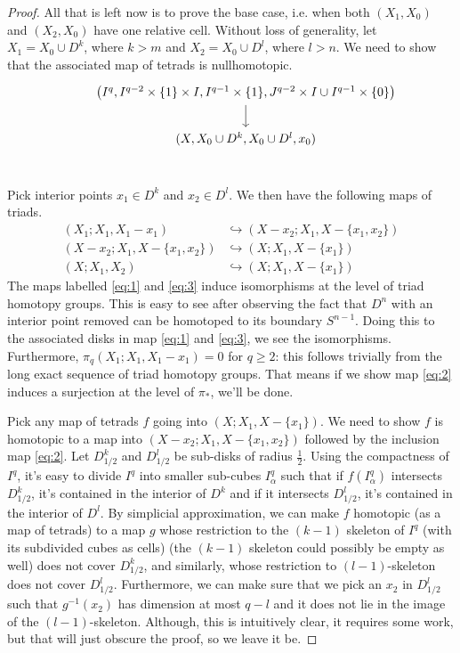\begin{proof}
    All that is left now is to prove the base case, i.e. when both $(X_1, X_0)$ and $(X_2, X_0)$
    have one relative cell. Without loss of generality, let $X_1 = X_0 \cup D^k$, where $k > m$ and
    $X_2 = X_0 \cup D^l$, where $l > n$. We need to show that the associated map of tetrads is
    nullhomotopic.
    \[
      \begin{tikzcd}
        &\left( I^q, I^{q-2} \times \{1\} \times I, I^{q-1} \times \{1\}, J^{q-2} \times I \cup I^{q-1} \times \{0\} \right) \ar[d] \\
        &(X, X_0 \cup D^k, X_0 \cup D^l, x_0) \\
      \end{tikzcd}
    \]

    Pick interior points $x_1 \in D^k$ and $x_2 \in D^l$. We then have the following maps of triads.
    \begin{align}
      (X_1; X_1, X_1 - x_1) &\hookrightarrow (X - x_2; X_1, X - \{x_1, x_2\}) \label{eq:1} \\
      (X - x_2; X_1, X - \{x_1, x_2\}) &\hookrightarrow (X; X_1, X - \{x_1\}) \label{eq:2} \\
      (X; X_1, X_2) &\hookrightarrow (X; X_1, X - \{x_1\}) \label{eq:3}
    \end{align}
    The maps labelled \ref{eq:1} and \ref{eq:3} induce isomorphisms at the level of triad homotopy
    groups.  This is easy to see after observing the fact that $D^n$ with an interior point removed
    can be homotoped to its boundary $S^{n-1}$. Doing this to the associated disks in map \ref{eq:1}
    and \ref{eq:3}, we see the isomorphisms. Furthermore, $\pi_q(X_1; X_1, X_1 - x_1) = 0$ for
    $q \geq 2$: this follows trivially from the long exact sequence of triad homotopy groups. That
    means if we show map \ref{eq:2} induces a surjection at the level of $\pi_{\ast}$, we'll be
    done.

    Pick any map of tetrads $f$ going into $(X; X_1, X - \{x_1\})$. We need to show $f$ is homotopic
    to a map into $(X - x_2; X_1, X - \{x_1, x_2\})$ followed by the inclusion map \ref{eq:2}. Let
    $D^k_{1/2}$ and $D^l_{1/2}$ be sub-disks of radius $\frac{1}{2}$. Using the compactness of
    $I^q$, it's easy to divide $I^q$ into smaller sub-cubes $I^q_{\alpha}$ such that if
    $f(I^q_{\alpha})$ intersects $D^k_{1/2}$, it's contained in the interior of $D^k$ and if it
    intersects $D^l_{1/2}$, it's contained in the interior of $D^l$. By simplicial approximation, we
    can make $f$ homotopic (as a map of tetrads) to a map $g$ whose restriction to the $(k-1)$
    skeleton of $I^q$ (with its subdivided cubes as cells) (the $(k-1)$ skeleton could possibly be
    empty as well) does not cover $D^k_{1/2}$, and similarly, whose restriction to $(l-1)$-skeleton
    does not cover $D^l_{1/2}$. Furthermore, we can make sure that we pick an $x_2$ in $D^l_{1/2}$
    such that $g^{-1}(x_2)$ has dimension at most $q-l$ and it does not lie in the image of the
    $(l-1)$-skeleton. Although, this is intuitively clear, it requires some work, but that will just
    obscure the proof, so we leave it be.


\end{proof}

